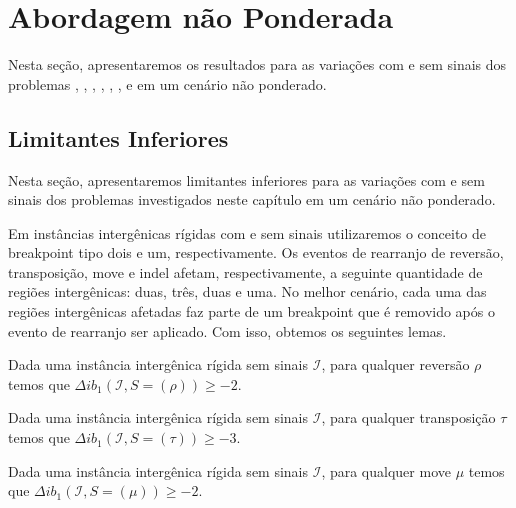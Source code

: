 \section{Abordagem não Ponderada}

Nesta seção, apresentaremos os resultados para as variações com e sem sinais dos problemas \SbIR{}, \SbIRI{}, \SbIRM{}, \SbIRMI{}, \SbIRT{}, \SbIRTI{}, \SbIRTM{} e \SbIRTMI{} em um cenário não ponderado.

\subsection{Limitantes Inferiores}

Nesta seção, apresentaremos limitantes inferiores para as variações com e sem sinais dos problemas investigados neste capítulo em um cenário não ponderado.

Em instâncias intergênicas rígidas com e sem sinais utilizaremos o conceito de breakpoint tipo dois e um, respectivamente. Os eventos de rearranjo de reversão, transposição, move e indel afetam, respectivamente, a seguinte quantidade de regiões intergênicas: duas, três, duas e uma. No melhor cenário, cada uma das regiões intergênicas afetadas faz parte de um breakpoint que é removido após o evento de rearranjo ser aplicado. Com isso, obtemos os seguintes lemas.

\begin{lemma}\label{lemma:KFFPUBQG}
Dada uma instância intergênica rígida sem sinais $\mathcal{I}$, para qualquer reversão $\rho$ temos que $\Delta ib_1(\mathcal{I}, S = (\rho)) \ge -2$.
\end{lemma}

\begin{lemma}\label{lemma:IUJZCMMV}
Dada uma instância intergênica rígida sem sinais $\mathcal{I}$, para qualquer transposição $\tau$ temos que $\Delta ib_1(\mathcal{I}, S = (\tau)) \ge -3$.
\end{lemma}

\begin{lemma}\label{lemma:SYXLGTAP}
Dada uma instância intergênica rígida sem sinais $\mathcal{I}$, para qualquer move $\mu$ temos que $\Delta ib_1(\mathcal{I}, S = (\mu)) \ge -2$.
\end{lemma}

